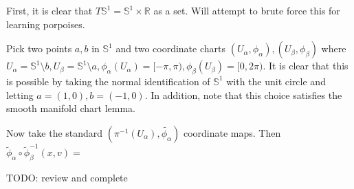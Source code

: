 First, it is clear that $T\mathbb{S}^1 = \mathbb{S}^1 \times \mathbb{R}$ as a set.  Will attempt to brute force this for learning porpoises.

Pick two points $a, b$ in $\mathbb{S}^1$ and two coordinate charts $(U_{\alpha}, \phi_{\alpha}), (U_{\beta}, \phi_{\beta})$ where $U_\alpha = \mathbb{S}^1 \setminus b, U_{\beta} = \mathbb{S}^1 \setminus a, \phi_{\alpha}(U_{\alpha}) = [-\pi,\pi), \phi_{\beta}(U_{\beta}) = [0,2\pi)$.  It is clear that this is possible by taking the normal identification of $\mathbb{S}^1$ with the unit circle and letting $a = (1,0), b = (-1,0)$.  In addition, note that this choice satisfies the smooth manifold chart lemma.

Now take the standard $(\pi^{-1}(U_{\alpha}), \tilde{\phi_{\alpha}})$ coordinate maps.  Then $\tilde{\phi}_\alpha \circ \tilde{\phi}_\beta^{-1} (x, v) = $

TODO: review and complete